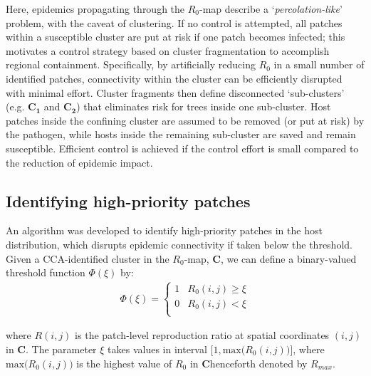 Here, epidemics propagating through the $R_0$-map describe a `\textit{percolation-like}' problem, with the caveat of clustering.
If no control is attempted, all patches within a susceptible cluster are put at risk if one patch becomes infected; 
this motivates a control strategy based on cluster fragmentation to accomplish regional containment.
Specifically, by artificially reducing $R_0$ in a small number of identified patches, connectivity within the cluster can be efficiently disrupted with minimal effort.
Cluster fragments then define disconnected `sub-clusters' (e.g. $\mathbf{C_1}$ and $\mathbf{C_2}$) that eliminates risk for trees inside one sub-cluster.
Host patches inside the confining cluster are assumed to be removed (or put at risk) by the pathogen, while hosts inside the remaining sub-cluster are saved and remain susceptible.
Efficient control is achieved if the control effort is small compared to the reduction of epidemic impact.

\subsection{Identifying high-priority patches}
\label{sec:fragmentation-method-1}

An algorithm was developed to identify high-priority patches in the host distribution, which disrupts epidemic connectivity if taken below the threshold.
Given a CCA-identified cluster in the $R_0$-map, $\mathbf{C}$, we can define a binary-valued threshold function $\Phi(\xi)$ by:
\begin{align}
\label{eq:xi-step}
\Phi(\xi) = \left\{ \begin{array}{cc} 
                1 & R_0(i, j) \geq \xi \\
                0 & R_0(i, j) < \xi \\
                \end{array} \right.
\end{align}

where $R(i,j)$ is the patch-level reproduction ratio at spatial coordinates $(i,j)$ in $\mathbf{C}$.
The parameter $\xi$ takes values in interval $\big[1, \mathrm{max}\big( R_0(i,j)\big) \big]$, 
where $\mathrm{max}\big(R_0(i, j)\big)$ is the highest value of $R_0$ in $\mathbf{C}$\textemdash henceforth denoted by $R_{max}$.

